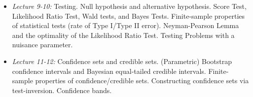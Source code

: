 \documentclass[11pt]{article}
\begin{document}
\begin{enumerate}
\begin{itemize}
\item \emph{Lecture 9-10:} Testing. Null hypothesis and alternative hypothesis. Score Test, Likelihood Ratio Test, Wald tests, and Bayes Tests. Finite-sample properties of statistical tests (rate of Type I/Type II error). Neyman-Pearson Lemma and the optimality of the Likelihood Ratio Test. Testing Problems with a nuisance parameter. \\

\item \emph{Lecture 11-12:} Confidence sets and credible sets. (Parametric) Bootstrap confidence intervals and Bayesian equal-tailed credible intervals. Finite-sample properties of confidence/credible sets. Constructing confidence sets via test-inversion. Confidence bands. 

\end{itemize}

\end{enumerate}



\end{document}
